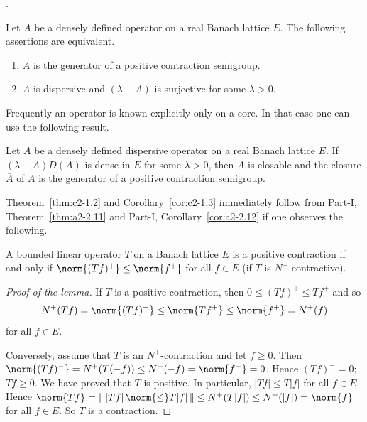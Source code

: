 \textcite{phillips:1962}.
\begin{theorem}\label{thm:c2-1.2}
%
%
Let $A$ be a densely defined operator on a real Banach lattice $E$. 
The following assertions are equivalent.
\begin{enumerate}[\upshape (a)]
\item \label{thm:c2-1.2-1}
$A$ is the generator of a positive contraction semigroup.
\item \label{thm:c2-1.2-2}
$A$ is dispersive and $(\lambda-A)$ is surjective for some $\lambda > 0$.
\end{enumerate}
\end{theorem}
Frequently an operator is known explicitly only on a core. In that case one can use the following result.
\begin{corollary}\label{cor:c2-1.3}
%
Let $A$ be a densely defined dispersive operator on a real Banach lattice $E$. 
If\/ $(\lambda - A)D(A)$ is dense in $E$ for some $\lambda > 0$, then $A$ is closable and the closure $\overline{A}$ of\/ $A$ is the generator of a positive contraction semigroup.
\end{corollary}
Theorem~\ref{thm:c2-1.2}  and Corollary~\ref{cor:c2-1.3}  immediately follow from Part-I, Theorem~\ref{thm:a2-2.11} and Part-I, Corollary~\ref{cor:a2-2.12}  if one observes the following.
\begin{lemma}\label{lem:c2-1.4}
%
A bounded linear operator  $T$ on a Banach lattice $E$ is a positive contraction if and only if\/ $\norm{(Tf)^{+}} \leq \norm{f^{+}}$ for all $f \in E$ (\ie if\/ $T$ is $N^{+}$-contractive).
\end{lemma}
\begin{proof}[Proof of the lemma]
If\/ $T$ is a positive contraction, then $0 \leq (Tf)^{+} \leq Tf^{+}$ and so 
%
\[
	N^{+}(Tf) = \norm{(Tf)^{+}} \leq \norm{Tf^{+}} \leq \norm{f^{+}} = N^{+}(f)
\]
%
for all $f \in E$. 

Conversely, assume that $T$ is an $N^{+}$-contraction and let $f \geq 0$. 
Then $\norm{(Tf)^{-}} = N^{+}(T(-f)) \leq N^{+}(-f) = \norm{f^{-}} = 0$. 
Hence $(Tf)^{-} = 0$; \ie $Tf \geq 0$. 
We have proved that $T$ is positive. 
In particular, $|Tf| \leq T|f|$ for all $f \in E$. 
Hence $\norm{Tf} = \|\,|Tf|\,\norm{ \leq }T|f|\,\| \leq N^{+}(T|f|) \leq N^{+}(|f|) = \norm{f}$ for all $f \in E$. 
So $T$ is a contraction.
\end{proof}
